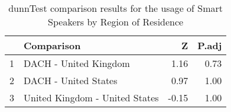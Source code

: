 \begin{table}[ht]
\centering
\begin{tabular}{rlrr}
  \hline
 & Comparison & Z & P.adj \\ 
  \hline
1 & DACH - United Kingdom & 1.16 & 0.73 \\ 
  2 & DACH - United States & 0.97 & 1.00 \\ 
  3 & United Kingdom - United States & -0.15 & 1.00 \\ 
   \hline
\end{tabular}
\caption{dunnTest comparison results for the usage of Smart Speakers by Region of Residence} 
\end{table}
